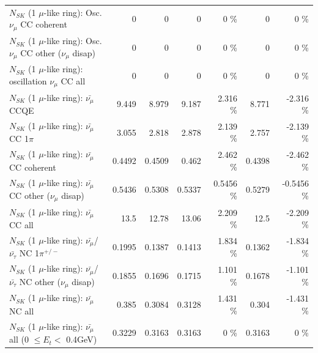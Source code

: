 \begin{table}
\begin{tabular}{| l | r | r | r  r | r  r |}
                        $N_{SK}$ (1 $\mu$-like ring): Osc. $\nu_\mu$ CC coherent &               0 &               0 &               0 &        0 \%  &               0 &        0 \%  \\ 
         $N_{SK}$ (1 $\mu$-like ring): Osc. $\nu_\mu$ CC other ($\nu_\mu$ disap) &               0 &               0 &               0 &        0 \%  &               0 &        0 \%  \\ 
                      $N_{SK}$ (1 $\mu$-like ring): oscillation $\nu_\mu$ CC all &               0 &               0 &               0 &        0 \%  &               0 &        0 \%  \\ 
\hline
\hline
                              $N_{SK}$ (1 $\mu$-like ring): $\bar{\nu_\mu}$ CCQE &           9.449 &           8.979 &           9.187 &    2.316 \%  &           8.771 &   -2.316 \%  \\ 
                         $N_{SK}$ (1 $\mu$-like ring): $\bar{\nu_\mu}$ CC 1$\pi$ &           3.055 &           2.818 &           2.878 &    2.139 \%  &           2.757 &   -2.139 \%  \\ 
                       $N_{SK}$ (1 $\mu$-like ring): $\bar{\nu_\mu}$ CC coherent &          0.4492 &          0.4509 &           0.462 &    2.462 \%  &          0.4398 &   -2.462 \%  \\ 
        $N_{SK}$ (1 $\mu$-like ring): $\bar{\nu_\mu}$ CC other ($\nu_\mu$ disap) &          0.5436 &          0.5308 &          0.5337 &   0.5456 \%  &          0.5279 &  -0.5456 \%  \\ 
                          $N_{SK}$ (1 $\mu$-like ring): $\bar{\nu_{\mu}}$ CC all &            13.5 &           12.78 &           13.06 &    2.209 \%  &            12.5 &   -2.209 \%  \\ 
\hline
  $N_{SK}$ (1 $\mu$-like ring): $\bar{\nu_\mu}$/$\bar{\nu_\tau}$ NC 1$\pi^{+/-}$ &          0.1995 &          0.1387 &          0.1413 &    1.834 \%  &          0.1362 &   -1.834 \%  \\ 
$N_{SK}$ (1 $\mu$-like ring): $\bar{\nu_\mu}$/$\bar{\nu_\tau}$ NC other ($\nu_\mu$ disap) &          0.1855 &          0.1696 &          0.1715 &    1.101 \%  &          0.1678 &   -1.101 \%  \\ 
                          $N_{SK}$ (1 $\mu$-like ring): $\bar{\nu_{\mu}}$ NC all &           0.385 &          0.3084 &          0.3128 &    1.431 \%  &           0.304 &   -1.431 \%  \\ 
\hline
   $N_{SK}$ (1 $\mu$-like ring): $\bar{\nu_{\mu}}$ all (0 $\leq E_{t} <$ 0.4GeV) &          0.3229 &          0.3163 &          0.3163 &        0 \%  &          0.3163 &        0 \%  \\ 

\end{tabular}
\end{table}
